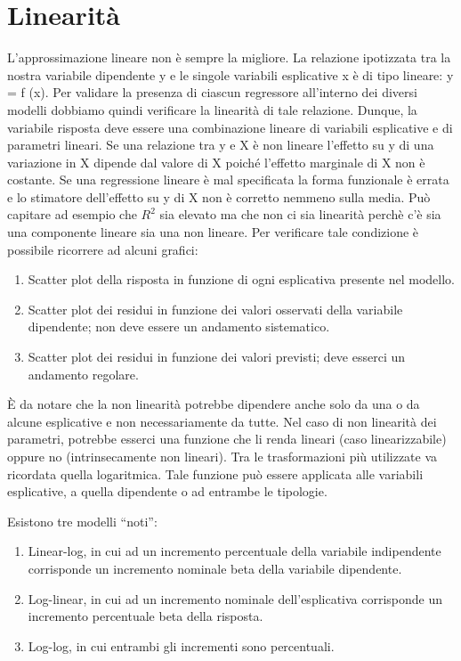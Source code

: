 \documentclass[a4page, 11pt]{article}
\begin{document}
\section{Linearità}

L'approssimazione lineare non è sempre la migliore. La relazione ipotizzata tra la nostra variabile dipendente y e le singole variabili esplicative x è di tipo lineare: y = f (x).
\newline
Per validare la presenza di ciascun regressore all’interno dei diversi modelli dobbiamo quindi verificare la linearità di tale relazione.
\newline
Dunque, la variabile risposta deve essere una combinazione lineare di variabili esplicative e di parametri lineari.
\newline
Se una relazione tra y e X è non lineare l’effetto su y di una variazione in X dipende dal valore di X poiché l’effetto marginale di X non è costante.
Se una regressione lineare è mal specificata la forma funzionale è
errata e lo stimatore dell’effetto su y di X non è corretto nemmeno sulla media. Può capitare ad esempio che $R^{2}$ sia elevato ma che non ci sia linearità perchè c'è sia una componente lineare sia una non lineare. 
\newline
Per verificare tale condizione è possibile ricorrere ad alcuni grafici:
\begin{enumerate}[noitemsep]
\item Scatter plot della risposta in funzione di ogni esplicativa presente nel modello.
\item Scatter plot dei residui in funzione dei valori osservati della variabile dipendente; non deve essere un andamento sistematico.
\item Scatter plot dei residui in funzione dei valori previsti; deve esserci un andamento regolare.
\end{enumerate}
È da notare che la non linearità potrebbe dipendere anche solo da una o da alcune esplicative e non necessariamente da tutte.
\newline
Nel caso di non linearità dei parametri, potrebbe esserci una funzione che li renda lineari (caso linearizzabile) oppure no (intrinsecamente non lineari).
\newline
Tra le trasformazioni più utilizzate va ricordata quella logaritmica. Tale funzione può essere applicata alle variabili esplicative, a quella dipendente o ad entrambe le tipologie. 

Esistono tre modelli ``noti'':
\begin{enumerate}[noitemsep]
\item Linear-log, in cui ad un incremento percentuale della variabile indipendente corrisponde un incremento nominale beta della variabile dipendente.
\item Log-linear, in cui ad un incremento nominale dell’esplicativa corrisponde un incremento percentuale beta della risposta.
\item Log-log, in cui entrambi gli incrementi sono percentuali.
\end{enumerate}
\end{document}
